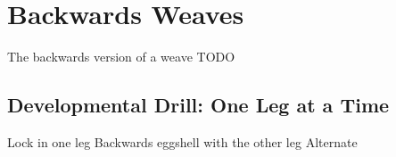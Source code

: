 \section{Backwards Weaves}
\label{sec:sticky/backwards_carves}

The backwards version of a weave {\color{red} TODO} 



\subsection*{Developmental Drill: One Leg at a Time}
Lock in one leg
Backwards eggshell with the other leg
Alternate


